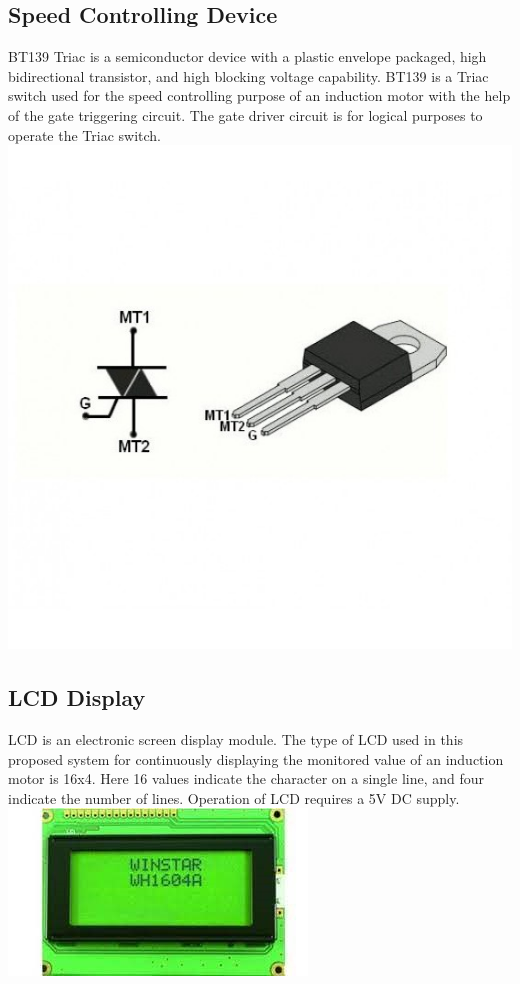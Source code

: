 \subsection{Speed Controlling Device}
BT139 Triac is a semiconductor device with a plastic envelope packaged, high bidirectional transistor, and high blocking voltage capability. BT139 is a Triac switch used for the speed controlling purpose of an induction motor with the help of the gate triggering circuit. The gate driver circuit is for logical purposes to operate the Triac switch.\\
{\includegraphics[height=0.2\textheight]{Figures/triac.jpg}}
\subsection{LCD Display}
LCD is an electronic screen display module. The type of LCD used in this proposed system for continuously displaying the monitored value of an induction motor is 16x4. Here 16 values indicate the character on a single line, and four indicate the number of lines. Operation of LCD requires a 5V DC supply.\\
{\includegraphics[height=0.2\textheight]{Figures/lcd.jpg}}

